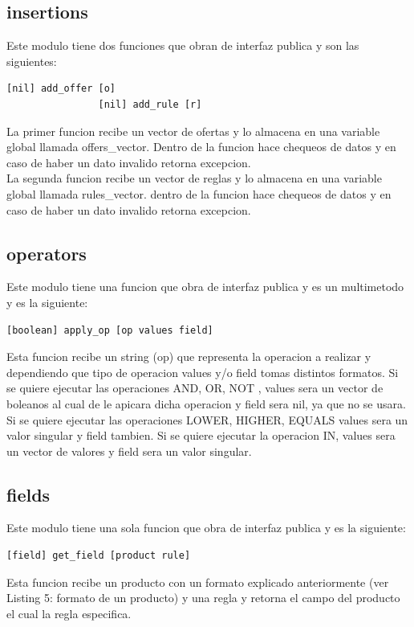 \documentclass[a4paper, 12pt]{article}
\begin{document}
		\subsection{insertions}
			Este modulo tiene dos funciones que obran de interfaz publica y son las siguientes:
			\begin{lstlisting}[frame=tb, caption=firmas de la interfaz publica, label=zebra, tabsize=1]
				[nil] add_offer [o]
				[nil] add_rule [r]
			\end{lstlisting}
			La primer funcion recibe un vector de ofertas y lo almacena en una variable global llamada offers\_vector. Dentro de la 			funcion hace chequeos de datos y en caso de haber un dato invalido retorna excepcion.\\
			La segunda funcion recibe un vector de reglas y lo almacena en una variable global llamada rules\_vector. dentro de la 				funcion hace chequeos de datos y en caso de haber un dato invalido retorna excepcion.\\
		\newpage
		\subsection{operators}
			Este modulo tiene una funcion que obra de interfaz publica y es un multimetodo y es la siguiente:
			\begin{lstlisting}[frame=tb, caption=firmas de la interfaz publica, label=zebra, tabsize=1]
				[boolean] apply_op [op values field]
			\end{lstlisting}
			Esta funcion recibe un string (op) que representa la operacion a realizar y dependiendo que tipo de operacion values 
			y/o field tomas distintos formatos. Si se quiere ejecutar las operaciones AND, OR, NOT , values sera un vector de 				boleanos al cual de le apicara dicha operacion y field sera nil, ya que no se usara. Si se quiere ejecutar las 				operaciones LOWER, HIGHER, EQUALS values sera un valor singular y field tambien. Si se quiere ejecutar la operacion IN, 			values sera un vector de valores y field sera un valor singular.

		\newpage
		\subsection{fields}
			Este modulo tiene una sola funcion que obra de interfaz publica y es la siguiente:
			\begin{lstlisting}[frame=tb, caption=firmas de la interfaz publica, label=zebra, tabsize=1]
				[field] get_field [product rule]
			\end{lstlisting}
			Esta funcion recibe un producto	con un formato explicado anteriormente (ver Listing 5: formato de un producto) y una 				regla y retorna el campo del producto el cual la regla especifica.\\
\end{document}
